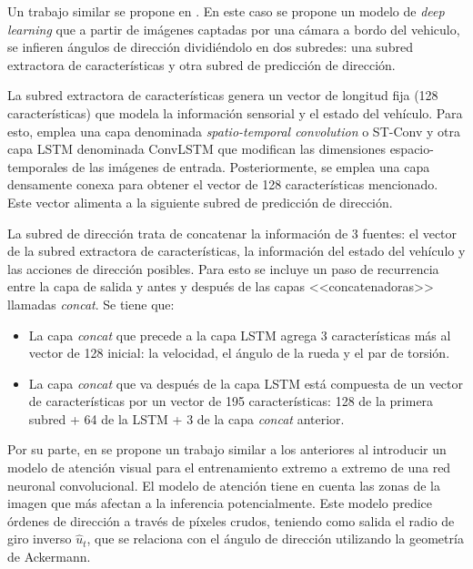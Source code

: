 Un trabajo similar se propone en \cite{deep-steering}. En este caso se propone un modelo de \textit{deep learning} que a partir de imágenes captadas por una cámara a bordo del vehiculo, se infieren ángulos de dirección dividiéndolo en dos subredes: una subred extractora de características y otra subred de predicción de dirección.

La subred extractora de características genera un vector de longitud fija (128 características) que modela la información sensorial y el estado del vehículo. Para esto, emplea una capa denominada \textit{spatio-temporal convolution} o ST-Conv y otra capa LSTM denominada ConvLSTM que modifican las dimensiones espacio-temporales de las imágenes de entrada. Posteriormente, se emplea una capa densamente conexa para obtener el vector de 128 características mencionado. Este vector alimenta a la siguiente subred de predicción de dirección.

La subred de dirección trata de concatenar la información de 3 fuentes: el vector de la subred extractora de características, la información del estado del vehículo y las acciones de dirección posibles. Para esto se incluye un paso de recurrencia entre la capa de salida y antes y después de las capas <<concatenadoras>> llamadas \textit{concat}. Se tiene que:

\begin{itemize}
    \item La capa \textit{concat} que precede a la capa LSTM agrega 3 características más al vector de 128 inicial: la velocidad, el ángulo de la rueda y el par de torsión.
    \item La capa \textit{concat} que va después de la capa LSTM está compuesta de un vector de características por un vector de 195 características: 128 de la primera subred + 64 de la LSTM + 3 de la capa \textit{concat} anterior.
\end{itemize}

Por su parte, en \cite{interpretable} se propone un trabajo similar a los anteriores al introducir un modelo de atención visual para el entrenamiento extremo a extremo de una red neuronal convolucional. El modelo de atención tiene en cuenta las zonas de la imagen que más afectan a la inferencia potencialmente. Este modelo predice órdenes de dirección a través de píxeles crudos, teniendo como salida el radio de giro inverso $\hat{u}_t$, que se relaciona con el ángulo de dirección utilizando la geometría de Ackermann.

